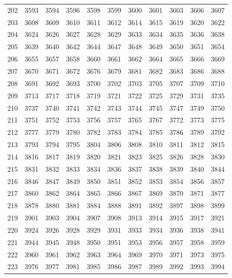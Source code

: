 \begin{longtable}{|r|rrrrrrrrrr|}
  202 & 3593 & 3594 & 3596 & 3598 & 3599 & 3600 & 3601 & 3603 & 3606 & 3607 \\ 
  203 & 3608 & 3609 & 3610 & 3611 & 3612 & 3614 & 3615 & 3619 & 3620 & 3622 \\ 
  204 & 3624 & 3626 & 3627 & 3628 & 3629 & 3633 & 3634 & 3635 & 3636 & 3638 \\ 
  205 & 3639 & 3640 & 3642 & 3644 & 3647 & 3648 & 3649 & 3650 & 3651 & 3654 \\ 
  206 & 3655 & 3657 & 3658 & 3660 & 3661 & 3662 & 3664 & 3665 & 3666 & 3669 \\ 
  207 & 3670 & 3671 & 3672 & 3676 & 3679 & 3681 & 3682 & 3683 & 3686 & 3688 \\ 
  208 & 3691 & 3692 & 3693 & 3700 & 3702 & 3703 & 3705 & 3707 & 3709 & 3710 \\ 
  209 & 3713 & 3717 & 3718 & 3719 & 3721 & 3722 & 3725 & 3729 & 3731 & 3735 \\ 
  210 & 3737 & 3740 & 3741 & 3742 & 3743 & 3744 & 3745 & 3747 & 3749 & 3750 \\ 
  211 & 3751 & 3752 & 3753 & 3756 & 3757 & 3765 & 3767 & 3772 & 3773 & 3775 \\ 
  212 & 3777 & 3779 & 3780 & 3782 & 3783 & 3784 & 3785 & 3786 & 3789 & 3792 \\ 
  213 & 3793 & 3794 & 3795 & 3804 & 3806 & 3808 & 3810 & 3811 & 3812 & 3815 \\ 
  214 & 3816 & 3817 & 3819 & 3820 & 3821 & 3823 & 3825 & 3826 & 3828 & 3830 \\ 
  215 & 3831 & 3832 & 3833 & 3834 & 3836 & 3837 & 3838 & 3839 & 3840 & 3844 \\ 
  216 & 3846 & 3847 & 3849 & 3850 & 3851 & 3852 & 3853 & 3854 & 3856 & 3857 \\ 
  217 & 3860 & 3862 & 3864 & 3865 & 3866 & 3867 & 3869 & 3870 & 3871 & 3877 \\ 
  218 & 3878 & 3880 & 3881 & 3884 & 3888 & 3891 & 3892 & 3897 & 3898 & 3899 \\ 
  219 & 3901 & 3903 & 3904 & 3907 & 3908 & 3913 & 3914 & 3915 & 3917 & 3921 \\ 
  220 & 3924 & 3926 & 3928 & 3929 & 3931 & 3933 & 3934 & 3936 & 3938 & 3941 \\ 
  221 & 3944 & 3945 & 3948 & 3950 & 3951 & 3953 & 3956 & 3957 & 3958 & 3959 \\ 
  222 & 3960 & 3961 & 3962 & 3963 & 3964 & 3969 & 3970 & 3971 & 3973 & 3975 \\ 
  223 & 3976 & 3977 & 3981 & 3985 & 3986 & 3987 & 3989 & 3992 & 3993 & 3994 \\ 

\end{longtable}
